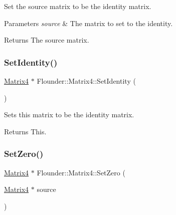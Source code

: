 Set the source matrix to be the identity matrix. 


\begin{DoxyParams}{Parameters}
{\em source} & The matrix to set to the identity. \\
\hline
\end{DoxyParams}
\begin{DoxyReturn}{Returns}
The source matrix. 
\end{DoxyReturn}
\mbox{\label{class_flounder_1_1_matrix4_a7a8cd8a631fc2254d2936280098eee37}} 
\subsubsection{\texorpdfstring{Set\+Identity()}{SetIdentity()}\hspace{0.1cm}{\footnotesize\ttfamily [2/2]}}
{\footnotesize\ttfamily \hyperlink{class_flounder_1_1_matrix4}{Matrix4} $\ast$ Flounder\+::\+Matrix4\+::\+Set\+Identity (\begin{DoxyParamCaption}{ }\end{DoxyParamCaption})}



Sets this matrix to be the identity matrix. 

\begin{DoxyReturn}{Returns}
This. 
\end{DoxyReturn}
\mbox{\label{class_flounder_1_1_matrix4_a5073e506428978d8e7d9c2ee0315a895}} 
\subsubsection{\texorpdfstring{Set\+Zero()}{SetZero()}\hspace{0.1cm}{\footnotesize\ttfamily [1/2]}}
{\footnotesize\ttfamily \hyperlink{class_flounder_1_1_matrix4}{Matrix4} $\ast$ Flounder\+::\+Matrix4\+::\+Set\+Zero (\begin{DoxyParamCaption}\item[{\hyperlink{class_flounder_1_1_matrix4}{Matrix4} $\ast$}]{source }\end{DoxyParamCaption})\hspace{0.3cm}{\ttfamily [static]}}



